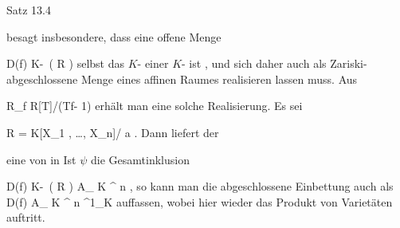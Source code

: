 { }
{





Satz 13.4

besagt insbesondere, dass eine offene Menge

\mavergleichskette
{\vergleichskette
{D(f)
}
{ \subseteq }{ K\!-\!\, \left(   R   \right)
}
{  }{
}
{    }{
}
{   }{
}
}
{}{}{}
selbst das
$K$-
einer
$K$-
ist
 {} {,}
und sich daher auch als Zariski-abgeschlossene Menge eines affinen Raumes realisieren lassen muss. Aus

\mavergleichskettedisp
{\vergleichskette
{R_f
}
{ \cong} { R[T]/(Tf- 1)
}
{ } {
}
{ } {
}
{ } {
}
}
{}{}{}
 {} {}
erhält man eine solche Realisierung. Es sei

\mavergleichskette
{\vergleichskette
{ R
}
{ = }{ K[X_1 , \ldots ,  X_n]/ {\mathfrak a}
}
{  }{
}
{    }{
}
{   }{
}
}
{}{}{.}
Dann liefert der

 {  }

eine
 {} {}
von
 in
 Ist $\psi$ die Gesamtinklusion

\mavergleichskettedisp
{\vergleichskette
{ D(f)
}
{ \subseteq} { K\!-\!\, \left(  R  \right)
}
{ \subseteq} { { {\mathbb A}_{  K }^{  n   } }
}
{ } {
}
{ } {
}
}
{}{}{,}
so kann man die abgeschlossene Einbettung auch als
 {D(f)} { { {\mathbb A}_{  K }^{  n   } } ^{1}_{K}
} {}
auffassen, wobei hier wieder das Produkt von Varietäten auftritt.





}

